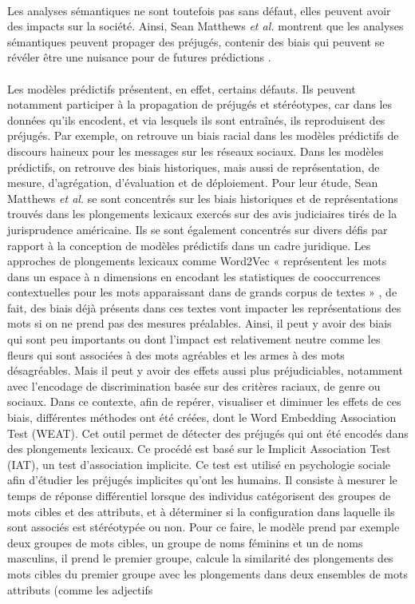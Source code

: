 \documentclass{article}
\begin{document}
\paragraph{}
Les analyses sémantiques ne sont toutefois pas sans défaut, elles peuvent avoir des impacts sur la société. Ainsi, Sean Matthews \textit{et al.} montrent que les analyses sémantiques peuvent propager des préjugés, contenir des biais qui peuvent se révéler être une nuisance pour de futures prédictions \cite{matthews2022gender}. 
\paragraph{}
Les modèles prédictifs présentent, en effet, certains défauts. Ils peuvent notamment participer à la propagation de préjugés et stéréotypes, car dans les données qu’ils encodent, et via lesquels ils sont entraînés, ils reproduisent des préjugés. Par exemple, on retrouve un biais racial dans les modèles prédictifs de discours haineux pour les messages sur les réseaux sociaux. Dans les modèles prédictifs, on retrouve des biais historiques, mais aussi de représentation, de mesure, d’agrégation, d’évaluation et de déploiement. Pour leur étude, Sean Matthews \textit{et al.} se sont concentrés sur les biais historiques et de représentations trouvés dans les plongements lexicaux exercés sur des avis judiciaires tirés de la jurisprudence américaine. Ils se sont également concentrés sur divers défis par rapport à la conception de modèles prédictifs dans un cadre juridique. Les approches de plongements lexicaux comme Word2Vec « représentent les mots dans un espace à n dimensions en encodant les statistiques de cooccurrences contextuelles pour les mots apparaissant dans de grands corpus de textes » \cite{matthews2022gender}, de fait, des biais déjà présents dans ces textes vont impacter les représentations des mots si on ne prend pas des mesures préalables. Ainsi, il peut y avoir des biais qui sont peu importants ou dont l’impact est relativement neutre comme les fleurs qui sont associées à des mots agréables et les armes à des mots désagréables. Mais il peut y avoir des effets aussi plus préjudiciables, notamment avec l’encodage de discrimination basée sur des critères raciaux, de genre ou sociaux. Dans ce contexte, afin de repérer, visualiser et diminuer les effets de ces biais, différentes méthodes ont été créées, dont le Word Embedding Association Test (WEAT). Cet outil permet de détecter des préjugés qui ont été encodés dans des plongements lexicaux. Ce procédé est basé sur le Implicit Association Test (IAT), un test d’association implicite. Ce test est utilisé en psychologie sociale afin d’étudier les préjugés implicites qu’ont les humains. Il consiste à mesurer le temps de réponse différentiel lorsque des individus catégorisent des groupes de mots cibles et des attributs, et à déterminer si la configuration dans laquelle ils sont associés est stéréotypée ou non. Pour ce faire, le modèle prend par exemple deux groupes de mots cibles, un groupe de noms féminins et un de noms masculins, il prend le premier groupe, calcule la similarité des plongements des mots cibles du premier groupe avec les plongements dans deux ensembles de mots attributs (comme les adjectifs 
\end{document}
